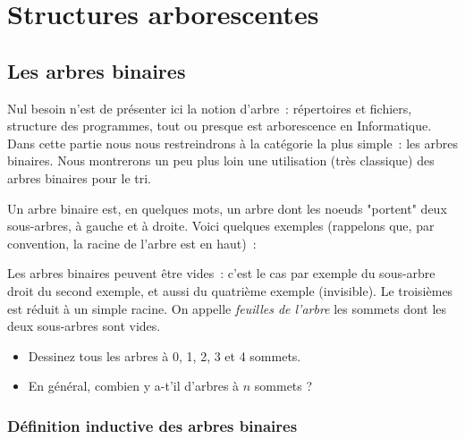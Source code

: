 
\chapter{Structures arborescentes}








\section{Les arbres binaires}

Nul besoin n'est de présenter ici la notion d'arbre~: répertoires et
fichiers, structure des programmes, tout ou presque est arborescence
en Informatique. Dans cette partie nous nous restreindrons à la
catégorie la plus simple~: les arbres binaires. Nous montrerons un peu
plus loin une utilisation (très classique) des arbres binaires pour le
tri.

Un arbre binaire est, en quelques mots, un arbre dont les noeuds
"portent" deux sous-arbres, à gauche et à droite.  Voici quelques
exemples (rappelons que, par convention, la racine de l'arbre est en
haut)~:

\begin{center}

\end{center}

Les arbres binaires peuvent \^etre vides~: c'est le cas par exemple du
sous-arbre droit du second exemple, et aussi du quatrième exemple
(invisible). Le troisièmes est réduit à un simple racine.
On appelle \emph{feuilles de l'arbre}  les sommets dont les deux
sous-arbres sont vides.

\begin{exercice}
\begin{itemize}
\item
 Dessinez tous les arbres à  0, 1, 2, 3 et 4 sommets.
\item  En général, combien y a-t'il d'arbres à $n$ sommets ?
\end{itemize}
\end{exercice}


\subsection{Définition inductive des arbres binaires}

